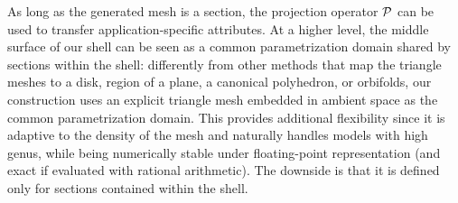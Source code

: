 As long as the generated mesh is a section, the projection operator $\P$ can be used to transfer application-specific attributes. At a higher level, the middle surface of our shell can be seen as a common parametrization domain shared by sections within the shell: differently from other methods that map the triangle meshes to a disk, region of a plane, a canonical polyhedron, or orbifolds, our construction uses an explicit triangle mesh embedded in ambient space as the common parametrization domain.
This provides additional flexibility since it is adaptive to the density of the mesh and naturally handles models with high genus, while being numerically stable under floating-point representation (and exact if evaluated with rational arithmetic). The downside is that it is defined only for sections contained within the shell. 


